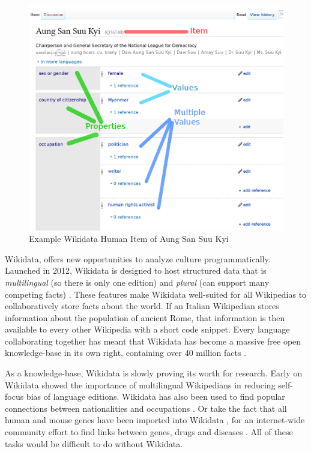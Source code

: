 \documentclass{sig-alternate-05-2015}
\begin{document}
\begin{figure}
\includegraphics[width=\columnwidth]{figures/aung_explainer_small.png} 
\caption{Example Wikidata Human Item of Aung San Suu Kyi}
\label{fig:aung}
\end{figure}

Wikidata, offers new opportunities to analyze culture programmatically. Launched in 2012, Wikidata is designed to host structured data that is \textit{multilingual} (so there is only one edition) and \textit{plural} (can support many competing facts) \cite{vrandecic_wikidata:_2014}.  These features make Wikidata well-suited for all Wikipedias to collaboratively store facts about the world. If an Italian Wikipedian stores information about the population of ancient Rome, that information is then available to every other Wikipedia with a short code snippet. Every language collaborating together has meant that Wikidata has become a massive free open knowledge-base in its own right, containing over 40 million facts \cite{krotzsch_how_????}.

As a knowledge-base, Wikidata is slowly proving its worth for research. Early on Wikidata showed the importance of multilingual Wikipedians in reducing self-focus bias of language editions. \cite{hale_multilinguals_2014} Wikidata has also been used to find popular connections between nationalities and occupations \cite{goldfarb_quantifying_2015}. Or take the fact that all human and mouse genes have been imported into Wikidata \cite{mitraka_wikidata:_2015}, for an internet-wide community effort to find links between genes, drugs and diseases \cite{burgstaller-muehlbacher_wikidata_2015}. All of these tasks would be difficult to do without Wikidata.
\end{document}

